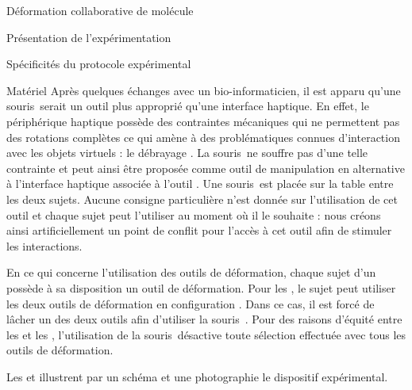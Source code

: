 \documentclass[myfrancais]{mythesis}
\begin{document}
\begin{mychapter}{Déformation collaborative de molécule}
\begin{mysection}{Présentation de l'expérimentation}
\begin{mysubsection}{Spécificités du protocole expérimental}
\begin{mysubsubsection}{Matériel}
					Après quelques échanges avec un bio-informaticien, il est apparu qu'une souris~\myThreeD serait un outil plus approprié qu'une interface haptique.
					En effet, le périphérique haptique possède des contraintes mécaniques qui ne permettent pas des rotations complètes ce qui amène à des problématiques connues d'interaction avec les objets virtuels : le débrayage .
					La souris~\myThreeD ne souffre pas d'une telle contrainte et peut ainsi être proposée comme outil de manipulation en alternative à l'interface haptique associée à l'outil .
					Une souris~\myThreeD \mySpaceNavigator est placée sur la table entre les deux sujets.
					Aucune consigne particulière n'est donnée sur l'utilisation de cet outil et chaque sujet peut l'utiliser au moment où il le souhaite : nous créons ainsi artificiellement un point de conflit pour l'accès à cet outil afin de stimuler les interactions.

					En ce qui concerne l'utilisation des outils de déformation, chaque sujet d'un  possède à sa disposition un outil de déformation.
					Pour les , le sujet peut utiliser les deux outils de déformation en configuration .
					Dans ce cas, il est forcé de lâcher un des deux outils afin d'utiliser la souris~\myThreeD.
					Pour des raisons d'équité entre les  et les , l'utilisation de la souris~\myThreeD désactive toute sélection effectuée avec tous les outils de déformation.

					Les  et  illustrent par un schéma et une photographie le dispositif expérimental.


\end{mysubsubsection}
\end{mysubsection}
\end{mysection}
\end{mychapter}
\end{document}
